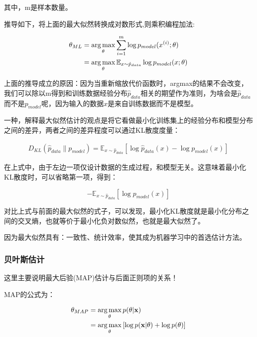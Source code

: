 其中，m是样本数量。

推导如下，将上面的最大似然转换成对数形式,则乘积编程加法:

\begin{align*}
\mathbf{\theta}_{ML} & = \operatorname*{arg\,max}_{\mathbf{\theta}} \sum_{i=1}^{m} \log p_{model}(x^{(i)}; \mathbf{\theta}) \\
					& = \operatorname*{arg\,max}_{\mathbf{\theta}} \mathbb{E}_{x \sim \hat{p}_{data}} \log p_{model}(x; \mathbf{\theta})
\end{align*}

上面的推导成立的原因：因为当重新缩放代价函数时，argmax的结果不会改变，我们可以除以m得到和训练数据经验分布$\hat{p}_{data}$相关的期望作为准则，为啥会是$\hat{p}_{data}$而不是$p_{model}$呢，因为输入的数据$x$是来自训练数据而不是模型。

一种，解释最大似然估计的观点是将它看做最小化训练集上的经验分布和模型分布之间的差异，两者之间的差异程度可以通过KL散度度量：

\begin{align*}
D_{KL}\left( \hat{p}_{data} \parallel p_{model} \right) = \mathbb{E}_{x\sim \hat{p}_{data}} \left[ \log \hat{p}_{data}(x) - \log p_{model} (x) \right]
\end{align*}

在上式中，由于左边一项仅设计数据的生成过程，和模型无关。这意味着最小化KL散度时，可以省略第一项，得到：

\begin{displaymath}
-\mathbb{E}_{x \sim \hat{p}_{data}} \left[ \log p_{model}(x) \right]
\end{displaymath}

对比上式与前面的最大似然的式子，可以发现，最小化KL散度就是最小化分布之间的交叉熵，也就等价于最小化负对数似然，也就是最大似然了。

因为最大似然具有：一致性、统计效率，使其成为机器学习中的首选估计方法。

\subsubsection{贝叶斯估计}

这里主要说明最大后验(MAP)估计与后面正则项的关系！

MAP的公式为：

\begin{align*}
\mathbf{\theta}_{MAP} & = \operatorname*{arg\,max}_{\mathbf{\theta}} p(\mathbf{\theta} | \mathbf{x}) \\
				& = \operatorname*{arg\,max}_{\mathbf{\theta}} \left[ \log p(\mathbf{x}|\mathbf{\theta}) + \log p(\mathbf{\theta}) \right]
\end{align*}


